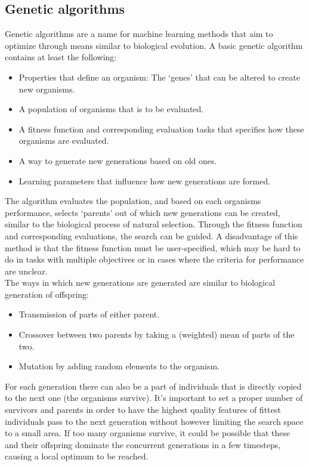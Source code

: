 \documentclass{article}
\begin{document}
\subsection{Genetic algorithms}
Genetic algorithms are a name for machine learning methods that aim to optimize through means similar to biological evolution. A basic genetic algorithm contains at least the following:

\begin{itemize} 
\item Properties that define an organism: The `genes' that can be altered to create new organisms.
\item A population of organisms that is to be evaluated.
\item A fitness function and corresponding evaluation tasks that specifies how these organisms are evaluated.
\item A way to generate new generations based on old ones. 
\item Learning parameters that influence how new generations are formed. 
\end{itemize}

The algorithm evaluates the population, and based on each organisms performance, selects `parents' out of which new generations can be created, similar to the biological process of natural selection. Through the fitness function and corresponding evaluations, the search can be guided. A disadvantage of this method is that the fitness function must be user-specified, which may be hard to do in tasks with multiple objectives or in cases where the criteria for performance are unclear. \\

The ways in which new generations are generated are similar to biological generation of offspring:
\begin{itemize} 
\item Transmission of parts of either parent.
\item Crossover between two parents by taking a (weighted) mean of parts of the two.
\item Mutation by adding random elements to the organism.
\end{itemize}

For each generation there can also be a part of individuals that is directly copied to the next one (the organisms survive). It's important to set a proper number of survivors and parents in order to have the highest quality features of fittest individuals pass to the next generation without however limiting the search space to a small area. If too many organisms survive, it could be possible that these and their offspring dominate the concurrent generations in a few timesteps, causing a local optimum to be reached.
\end{document}
